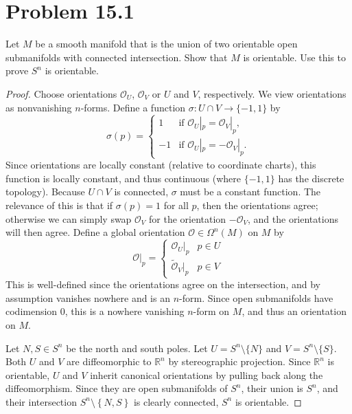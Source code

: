 \documentclass[10pt, letterpaper]{article}
\begin{document}
\section{Problem 15.1}
\begin{problem}
	Let $M$ be a smooth manifold that is the union of two orientable open submanifolds with connected intersection. Show that $M$ is orientable. Use this to prove $S^n$ is orientable.
\end{problem}
\begin{proof}
    Choose orientations $\mathcal{O} _U$, $\mathcal{O} _V$ or $U$ and $V$, respectively. We view orientations as nonvanishing $n$-forms. Define a function $\sigma: U \cap V \to \{ -1, 1 \}$ by
    \[
        \sigma(p) =
        \begin{cases}
            1 & \text{if } \mathcal{O}_U|_p = \mathcal{O}_V|_p, \\
            -1 & \text{if } \mathcal{O}_U|_p = -\mathcal{O}_V|_p.
        \end{cases}
    \]
    Since orientations are locally constant (relative to coordinate charts), this function is locally constant, and thus continuous (where $\{ -1, 1 \}$ has the discrete topology). Because $U \cap V$ is connected, $\sigma$ must be a constant function. The relevance of this is that if $\sigma (p)=1$ for all $p$, then the orientations agree; otherwise we can simply swap $\mathcal{O} _V$ for the orientation $-\mathcal{O} _V$, and the orientations will then agree. Define a global orientation $\mathcal{O}\in\Omega ^n(M)$ on $M$ by
    \[
        \mathcal{O}|_p =
        \begin{cases}
            \mathcal{O}_U|_p & p \in U \\
            \widetilde{\mathcal{O}}_V|_p & p \in V
        \end{cases}
    \]
    This is well-defined since the orientations agree on the intersection, and by assumption vanishes nowhere and is an $n$-form. Since open submanifolds have codimension 0, this is a nowhere vanishing $n$-form on $M$, and thus an orientation on $M$.

    Let $N, S \in S^n$ be the north and south poles. Let $U = S^n \setminus \{N\}$ and $V = S^n \setminus \{S\}$. Both $U$ and $V$ are diffeomorphic to $\mathbb{R}^n$ by stereographic projection. Since $\mathbb{R}^n$ is orientable, $U$ and $V$ inherit canonical orientations by pulling back along the diffeomorphism. Since they are open submanifolds of $S^n$, their union is $S^n$, and their intersection $S^n \setminus \left\{ N,S \right\} $ is clearly connected, $S^n$ is orientable.
\end{proof}
\end{document}
